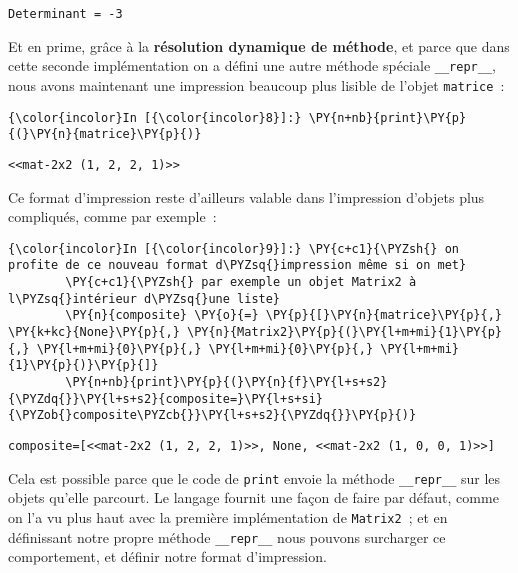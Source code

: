     \begin{Verbatim}[commandchars=\\\{\}]
Determinant = -3

    \end{Verbatim}

    Et en prime, grâce à la \textbf{résolution dynamique de méthode}, et
parce que dans cette seconde implémentation on a défini une autre
méthode spéciale \texttt{\_\_repr\_\_}, nous avons maintenant une
impression beaucoup plus lisible de l'objet \texttt{matrice}~:

    \begin{Verbatim}[commandchars=\\\{\}]
{\color{incolor}In [{\color{incolor}8}]:} \PY{n+nb}{print}\PY{p}{(}\PY{n}{matrice}\PY{p}{)}
\end{Verbatim}


    \begin{Verbatim}[commandchars=\\\{\}]
<<mat-2x2 (1, 2, 2, 1)>>

    \end{Verbatim}

    Ce format d'impression reste d'ailleurs valable dans l'impression
d'objets plus compliqués, comme par exemple~:

    \begin{Verbatim}[commandchars=\\\{\}]
{\color{incolor}In [{\color{incolor}9}]:} \PY{c+c1}{\PYZsh{} on profite de ce nouveau format d\PYZsq{}impression même si on met}
        \PY{c+c1}{\PYZsh{} par exemple un objet Matrix2 à l\PYZsq{}intérieur d\PYZsq{}une liste}
        \PY{n}{composite} \PY{o}{=} \PY{p}{[}\PY{n}{matrice}\PY{p}{,} \PY{k+kc}{None}\PY{p}{,} \PY{n}{Matrix2}\PY{p}{(}\PY{l+m+mi}{1}\PY{p}{,} \PY{l+m+mi}{0}\PY{p}{,} \PY{l+m+mi}{0}\PY{p}{,} \PY{l+m+mi}{1}\PY{p}{)}\PY{p}{]}
        \PY{n+nb}{print}\PY{p}{(}\PY{n}{f}\PY{l+s+s2}{\PYZdq{}}\PY{l+s+s2}{composite=}\PY{l+s+si}{\PYZob{}composite\PYZcb{}}\PY{l+s+s2}{\PYZdq{}}\PY{p}{)}
\end{Verbatim}


    \begin{Verbatim}[commandchars=\\\{\}]
composite=[<<mat-2x2 (1, 2, 2, 1)>>, None, <<mat-2x2 (1, 0, 0, 1)>>]

    \end{Verbatim}

    Cela est possible parce que le code de \texttt{print} envoie la méthode
\texttt{\_\_repr\_\_} sur les objets qu'elle parcourt. Le langage
fournit une façon de faire par défaut, comme on l'a vu plus haut avec la
première implémentation de \texttt{Matrix2}~; et en définissant notre
propre méthode \texttt{\_\_repr\_\_} nous pouvons surcharger ce
comportement, et définir notre format d'impression.

